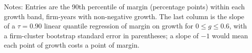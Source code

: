\begin{table}[t]\centering\small
\caption{Upper-decile margin by growth band, fiscal years 2010--2025}\label{tab:local}
\par\vspace{2pt}\footnotesize\raggedright Notes: Entries are the 90th percentile of margin (percentage points) within each growth band, firm-years with non-negative growth. The last column is the slope of a $\tau=0.90$ linear quantile regression of margin on growth for $0\leq g\leq0.6$, with a firm-cluster bootstrap standard error in parentheses; a slope of $-1$ would mean each point of growth costs a point of margin.
\end{table}